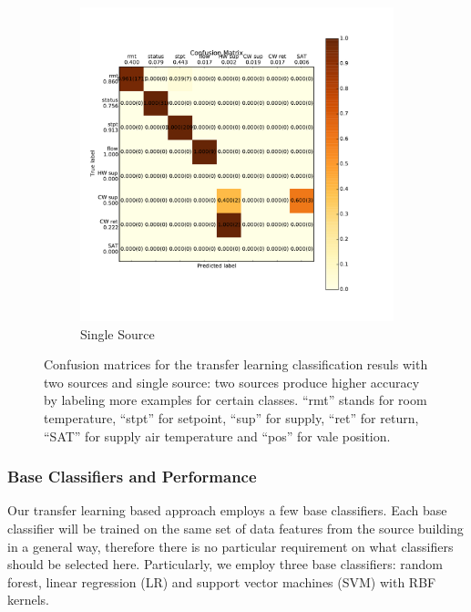 \begin{figure}[ht!]
\begin{subfigure}{0.48\textwidth}
    \includegraphics[width=\textwidth]{./fig/cm_single}
                \caption{Single Source}
  \end{subfigure}
\caption{Confusion matrices for the transfer learning classification resuls with two sources and single source: two sources produce higher accuracy by labeling more examples for certain classes. ``rmt'' stands for room temperature, ``stpt'' for setpoint, ``sup'' for supply, ``ret'' for return, ``SAT'' for supply air temperature and ``pos'' for vale position.}
\label{fig_cm}
\end{figure}


\subsubsection{Base Classifiers and Performance}
\label{sec:baseline}
Our transfer learning based approach employs a few base classifiers. Each base classifier will be trained on the same set of data features from the source building in a general way, therefore there is no particular requirement on what classifiers should be selected here.
Particularly, we employ three base classifiers: random forest, linear regression (LR) and support vector machines (SVM) with RBF kernels.


